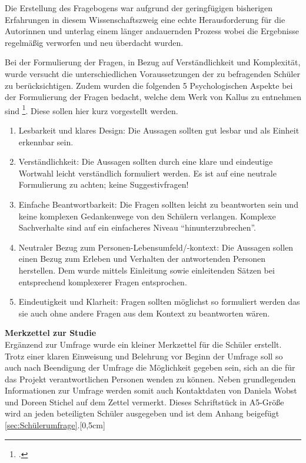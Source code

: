 Die Erstellung des Fragebogens war aufgrund der geringfügigen bisherigen Erfahrungen in diesem Wissenschaftszweig eine echte Herausforderung für die Autorinnen und unterlag einem länger andauernden Prozess wobei die Ergebnisse regelmäßig verworfen und neu überdacht wurden.
 
Bei der Formulierung der Fragen, in Bezug auf Verständlichkeit und Komplexität, wurde versucht die unterschiedlichen Voraussetzungen der zu befragenden Schüler zu berücksichtigen. Zudem wurden die folgenden 5 Psychologischen Aspekte bei der Formulierung der Fragen bedacht, welche dem Werk von Kallus zu entnehmen sind \footcite[vgl.][63-66]{Kallus2010}. Diese sollen hier kurz vorgestellt werden. 

\begin{enumerate}
	\item Lesbarkeit und klares Design: Die Aussagen sollten gut lesbar und als Einheit erkennbar sein. 
	\item Verständlichkeit: Die Aussagen sollten durch eine klare und eindeutige Wortwahl leicht verständlich formuliert werden. Es ist auf eine neutrale Formulierung zu achten; keine Suggestivfragen!
	\item Einfache Beantwortbarkeit: Die Fragen sollten leicht zu beantworten sein und keine komplexen Gedankenwege von den Schülern verlangen. Komplexe Sachverhalte sind auf ein einfacheres Niveau "`hinunterzubrechen"'.
	\item Neutraler Bezug zum Personen-Lebensumfeld/-kontext: Die Aussagen sollen einen Bezug zum Erleben und Verhalten der antwortenden Personen herstellen. Dem wurde mittels Einleitung sowie einleitenden Sätzen bei entsprechend komplexerer Fragen entsprochen.
	\item Eindeutigkeit und Klarheit: Fragen sollten möglichst so formuliert werden das sie auch ohne andere Fragen aus dem Kontext zu beantworten wären.
\end{enumerate}

\textbf{Merkzettel zur Studie}\\
Ergänzend zur Umfrage wurde ein kleiner Merkzettel für die Schüler erstellt. Trotz einer klaren Einweisung und Belehrung vor Beginn der Umfrage soll so auch nach Beendigung der Umfrage die Möglichkeit gegeben sein, sich an die für das Projekt verantwortlichen Personen wenden zu können. Neben grundlegenden Informationen zur Umfrage werden somit auch Kontaktdaten von Daniela Wobst und Doreen Stichel auf dem Zettel vermerkt. Dieses Schriftstück in A5-Größe wird an jeden beteiligten Schüler ausgegeben und ist dem Anhang beigefügt \ref{sec:Schülerumfrage}.[0,5cm]

